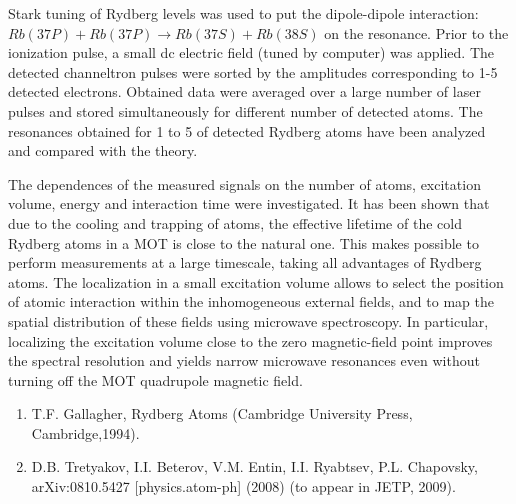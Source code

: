 Stark tuning of Rydberg levels was used to put the dipole-dipole
interaction: $Rb(37P)+Rb(37P)\rightarrow Rb(37S)+ Rb(38S)$ on the
resonance. Prior to the ionization pulse, a small dc electric field
(tuned by computer) was applied. The detected channeltron pulses were
sorted by the amplitudes corresponding to 1-5 detected electrons.
Obtained data were averaged over a large number of laser pulses and
stored simultaneously for different number of detected atoms. The
resonances obtained for 1 to 5 of detected Rydberg atoms have been
analyzed and compared with the theory.

The dependences of the measured
signals on the number of atoms, excitation volume, energy and
interaction time were investigated. It has been shown that due to the
cooling and trapping of atoms, the effective lifetime of the cold
Rydberg atoms in a MOT is close to the natural one. This makes possible
to perform measurements at a large timescale, taking all advantages of
Rydberg atoms. The localization in a small excitation volume allows to
select the position of atomic interaction within the inhomogeneous
external fields, and to map the spatial distribution of these fields
using microwave spectroscopy. In particular, localizing the excitation
volume close to the zero magnetic-field point improves the spectral
resolution and yields narrow microwave resonances even without turning
off the MOT quadrupole magnetic field.


\vspace{-4mm}

{\normalsize
\begin{enumerate}
\item T.F. Gallagher, Rydberg Atoms (Cambridge University Press, Cambridge,1994).
\item D.B. Tretyakov, I.I. Beterov, V.M. Entin, I.I. Ryabtsev, P.L. Chapovsky, arXiv:0810.5427 [physics.atom-ph] (2008)
(to appear in JETP, 2009).
\end{enumerate}
}

\vspace{\baselineskip}
